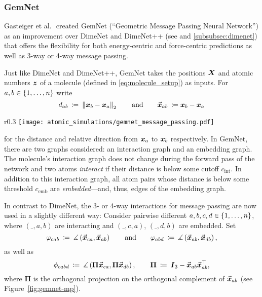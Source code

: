 \subsubsection{GemNet}
\label{subsubsec:gemnet}

Gasteiger et al. $\!\!$ created GemNet (\enquote{Geometric Message Passing Neural Network}) 
\cite{https://doi.org/10.48550/arxiv.2106.08903} 
as an improvement over DimeNet and DimeNet++ (see 
\cite{DBLP:journals/corr/abs-2003-03123, https://doi.org/10.48550/arxiv.2011.14115} 
and \ref{subsubsec:dimenet}) that offers the flexibility for both energy-centric 
and force-centric predictions as well as 3-way or 4-way message passing.

Just like DimeNet and DimeNet++, GemNet 
takes the positions $\boldsymbol{X}$ and atomic numbers $\boldsymbol{z}$ of a molecule 
(defined in \eqref{eq:molecule_setup}) as inputs. For $a, b \in \left\{1, \dots, n\right\}$ write
\[
    d_{ab} \: \coloneqq \: \left\lVert\boldsymbol{x}_b - \boldsymbol{x}_a\right\rVert_2 
    \qquad \text{and} \qquad 
    \vec{\boldsymbol{x}}_{ab} \: \coloneqq \boldsymbol{x}_b - \boldsymbol{x}_a
\]
\begin{wrapfigure}{r}{0.3\textwidth}
    \centering
    \vspace*{-0.75em}
    \texttt{[image: atomic\_simulations/gemnet\_message\_passing.pdf]}
    \caption{\cite{https://doi.org/10.48550/arxiv.2106.08903}}
    \label{fig:gemnet-mp}
\end{wrapfigure}
for the distance and relative direction from $\boldsymbol{x}_a$ to $\boldsymbol{x}_b$ respectively.
In GemNet, there are two graphs considered: an interaction graph and an embedding graph.
The molecule's interaction graph does not change during the forward pass of the network and 
two atoms \textit{interact} if their distance is below some 
cutoff $c_{\text{int}}$. In addition to this interaction graph, all atom pairs 
whose distance is below some threshold $c_{\text{emb}}$ are \textit{embedded}---and, thus, 
edges of the embedding graph.

In contrast to DimeNet, the 3- or 4-way interactions for message passing are now used 
in a slightly different way:
Consider pairwise different $a, b, c, d \in \left\{1, \dots, n\right\}$,
where $(\_, a, b)$ are interacting and $(\_, c, a)$, $(\_, d, b)$ are
embedded. Set
\[
    \varphi_{cab} \: \coloneqq \: 
    \measuredangle \left( \vec{\boldsymbol{x}}_{ca}, \vec{\boldsymbol{x}}_{ab} \right)
    \qquad \text{and} \qquad
    \varphi_{abd} \: \coloneqq \: 
    \measuredangle \left( \vec{\boldsymbol{x}}_{ab}, \vec{\boldsymbol{x}}_{db} \right) \text{,}
\]
as well as 
\[
    \phi_{cabd} \: \coloneqq \: 
    \measuredangle \left( \boldsymbol{\Pi} \vec{\boldsymbol{x}}_{ca}, \boldsymbol{\Pi} \vec{\boldsymbol{x}}_{db} \right),
    \qquad \boldsymbol{\Pi} \: \coloneqq \: 
    \boldsymbol{I}_3 - \vec{\boldsymbol{x}}_{ab} \vec{\boldsymbol{x}}_{ab}^\top \text{,}
\]
where $\boldsymbol{\Pi}$ is the orthogonal projection on the orthogonal
complement of $\vec{\boldsymbol{x}}_{ab}$ (see Figure~\ref{fig:gemnet-mp}).

